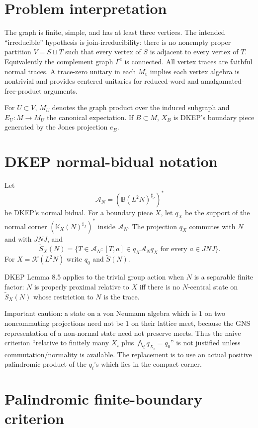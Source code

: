 \documentclass{article}
\begin{document}
\section*{Problem interpretation}

The graph is finite, simple, and has at least three vertices.  The intended
``irreducible'' hypothesis is join-irreducibility: there is no nonempty proper
partition $V=S\sqcup T$ such that every vertex of $S$ is adjacent to every
vertex of $T$.  Equivalently the complement graph $\Gamma^c$ is connected.
All vertex traces are faithful normal traces.  A trace-zero unitary in each
$M_v$ implies each vertex algebra is nontrivial and provides centered unitaries
for reduced-word and amalgamated-free-product arguments.

For $U\subset V$, $M_U$ denotes the graph product over the induced subgraph and
$E_U:M\to M_U$ the canonical expectation.  If $B\subset M$, $X_B$ is DKEP's
boundary piece generated by the Jones projection $e_B$.

\section*{DKEP normal-bidual notation}

Let
\[
  \mathcal A_N=(\mathbb B(L^2N)^{\sharp_J})^*
\]
be DKEP's normal bidual.  For a boundary piece $X$, let $q_X$ be the support of
the normal corner $(\mathbb K_X(N)^{\sharp_J})^*$ inside $\mathcal A_N$.  The
projection $q_X$ commutes with $N$ and with $JNJ$, and
\[
\widetilde S_X(N)=
\{T\in\mathcal A_N:[T,a]\in q_X\mathcal A_Nq_X
\text{ for every }a\in JNJ\}.
\]
For $X=\mathcal K(L^2N)$ write $q_0$ and $\widetilde S(N)$.

DKEP Lemma 8.5 applies to the trivial group action when $N$ is a separable
finite factor: $N$ is properly proximal relative to $X$ iff there is no
$N$-central state on $\widetilde S_X(N)$ whose restriction to $N$ is the trace.

Important caution: a state on a von Neumann algebra which is $1$ on two
noncommuting projections need not be $1$ on their lattice meet, because the GNS
representation of a non-normal state need not preserve meets.  Thus the naive
criterion ``relative to finitely many $X_i$ plus
$\bigwedge_iq_{X_i}=q_0$'' is not justified unless commutation/normality is
available.  The replacement is to use an actual positive palindromic product of
the $q_i$'s which lies in the compact corner.

\section*{Palindromic finite-boundary criterion}
\end{document}
